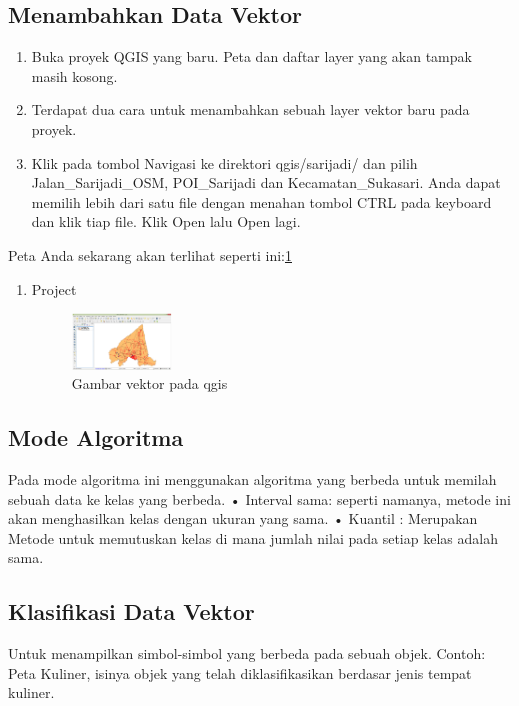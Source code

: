 \subsection{Menambahkan Data Vektor}
\begin{enumerate}
\item 
Buka proyek QGIS yang baru. Peta dan daftar layer yang akan tampak masih kosong.
\item
Terdapat dua cara untuk menambahkan sebuah layer vektor baru pada proyek.
\item
Klik pada tombol Navigasi ke direktori qgis/sarijadi/ dan pilih Jalan\_Sarijadi\_OSM, POI\_Sarijadi dan Kecamatan\_Sukasari. Anda dapat memilih lebih dari satu file dengan menahan tombol CTRL pada keyboard dan klik tiap file. Klik Open lalu Open lagi.
\end{enumerate}

Peta Anda sekarang akan terlihat seperti ini:\ref{vektor}
\begin{enumerate}
\item
Project
\begin{figure}[ht]
    \centerline{\includegraphics[width=0.25\textwidth]{figures/vektor}}
    \caption{Gambar vektor pada qgis}
    \label{vektor}
    \end{figure}

\end{enumerate}

\subsection{Mode Algoritma}
Pada mode algoritma ini menggunakan algoritma yang berbeda untuk memilah sebuah data ke kelas yang berbeda.
•	Interval sama: seperti namanya, metode ini akan menghasilkan kelas dengan ukuran yang sama.
•	Kuantil : Merupakan Metode untuk memutuskan kelas di mana jumlah nilai pada setiap kelas adalah sama.

\subsection{Klasifikasi Data Vektor}
Untuk menampilkan simbol-simbol yang berbeda pada sebuah objek. Contoh: Peta Kuliner, isinya objek yang telah diklasifikasikan berdasar jenis tempat kuliner.

